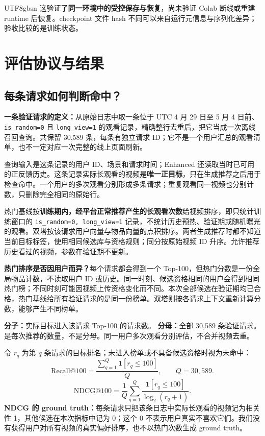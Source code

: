 \documentclass[10pt,a4paper]{article}
\newcommand{\note}[1]{\par\smallskip\noindent\colorbox{pale}{\parbox{\dimexpr\linewidth-2\fboxsep}{\small #1}}\par\smallskip}
\begin{document}
\begin{CJK*}{UTF8}{gbsn}
这验证了\textbf{同一环境中的受控保存与恢复}，尚未验证 Colab 断线或重建 runtime 后恢复。checkpoint 文件 hash 不同可以来自运行元信息与序列化差异；验收比较的是训练状态。

\endgroup
\begingroup\small
\section{评估协议与结果}
\subsection{每条请求如何判断命中？}
\textbf{一条验证请求的定义：}从原始日志中取一条位于 UTC 4 月 29 日至 5 月 4 日前、\texttt{is\_random=0} 且 \texttt{long\_view=1} 的观看记录，精确整行去重后，把它当成一次离线召回查询。共保留 30,589 条，每条有独立请求 ID；它不是一个用户汇总的观看清单，也不一定对应一次完整的线上页面刷新。

查询输入是这条记录的用户 ID、场景和请求时间；Enhanced 还读取当时已可用的正反馈历史。这条记录实际长观看的视频是\textbf{唯一正目标}，只在生成推荐之后用于检查命中。一个用户的多次观看分别形成多条请求；重复观看同一视频也分别计数，只删除完全相同的原始行。

热门基线按\textbf{训练期内，经平台正常推荐产生的长观看次数}给视频排序，即只统计训练窗口的 \texttt{is\_random=0, long\_view=1} 记录，不统计历史预热、验证期或随机曝光的观看。双塔按该请求用户向量与物品向量的点积排序。两者生成推荐时都不知道当前目标标签，使用相同候选库与资格规则；同分按原始视频 ID 升序。允许推荐历史看过的视频，参数在验证期不更新。

\textbf{热门排序是否因用户而异？}每个请求都会得到一个 Top-100，但热门分数是一份全局物品计数，不读取用户 ID 或历史。同一时刻、候选资格相同的用户会得到相同热门榜；不同时刻可能因视频上传资格变化而不同。本次全部候选在验证期均已合格，热门基线给所有验证请求的是同一份榜单。双塔则按各请求上下文重新计算分数，能够产生不同榜单。


\note{\textbf{分子：}实际目标进入该请求 Top-100 的请求数。\quad
\textbf{分母：}全部 30,589 条验证请求。\quad
100 是每次推荐的数量，不是分母。同一用户多次观看分别评估，不合并视频去重。}
令 $r_q$ 为第 $q$ 条请求的目标排名；未进入榜单或不具备候选资格时视为未命中：
\[
\mathrm{Recall@100}=\frac{\sum_{q=1}^{Q}\mathbf1[r_q\le100]}{Q},
\qquad Q=30,589.
\]
\[
\mathrm{NDCG@100}=\frac1Q\sum_{q=1}^{Q}
\frac{\mathbf1[r_q\le100]}{\log_2(r_q+1)}.
\]
\textbf{NDCG 的 ground truth：}每条请求只把该条日志中实际长观看的视频记为相关性 1，其他候选在本次指标中记为 0；这个 0 不表示用户真实不喜欢它们。我们没有获得用户对所有视频的真实偏好排序，也不以热门次数生成 ground truth。


\end{CJK*}
\end{document}

